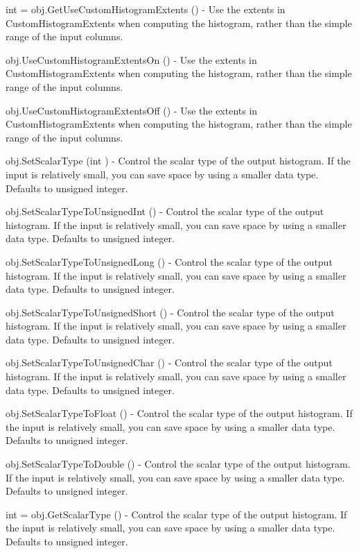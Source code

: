 \begin{DoxyItemize}
\item {\ttfamily int = obj.\-Get\-Use\-Custom\-Histogram\-Extents ()} -\/ Use the extents in Custom\-Histogram\-Extents when computing the histogram, rather than the simple range of the input columns.  
\item {\ttfamily obj.\-Use\-Custom\-Histogram\-Extents\-On ()} -\/ Use the extents in Custom\-Histogram\-Extents when computing the histogram, rather than the simple range of the input columns.  
\item {\ttfamily obj.\-Use\-Custom\-Histogram\-Extents\-Off ()} -\/ Use the extents in Custom\-Histogram\-Extents when computing the histogram, rather than the simple range of the input columns.  
\item {\ttfamily obj.\-Set\-Scalar\-Type (int )} -\/ Control the scalar type of the output histogram. If the input is relatively small, you can save space by using a smaller data type. Defaults to unsigned integer.  
\item {\ttfamily obj.\-Set\-Scalar\-Type\-To\-Unsigned\-Int ()} -\/ Control the scalar type of the output histogram. If the input is relatively small, you can save space by using a smaller data type. Defaults to unsigned integer.  
\item {\ttfamily obj.\-Set\-Scalar\-Type\-To\-Unsigned\-Long ()} -\/ Control the scalar type of the output histogram. If the input is relatively small, you can save space by using a smaller data type. Defaults to unsigned integer.  
\item {\ttfamily obj.\-Set\-Scalar\-Type\-To\-Unsigned\-Short ()} -\/ Control the scalar type of the output histogram. If the input is relatively small, you can save space by using a smaller data type. Defaults to unsigned integer.  
\item {\ttfamily obj.\-Set\-Scalar\-Type\-To\-Unsigned\-Char ()} -\/ Control the scalar type of the output histogram. If the input is relatively small, you can save space by using a smaller data type. Defaults to unsigned integer.  
\item {\ttfamily obj.\-Set\-Scalar\-Type\-To\-Float ()} -\/ Control the scalar type of the output histogram. If the input is relatively small, you can save space by using a smaller data type. Defaults to unsigned integer.  
\item {\ttfamily obj.\-Set\-Scalar\-Type\-To\-Double ()} -\/ Control the scalar type of the output histogram. If the input is relatively small, you can save space by using a smaller data type. Defaults to unsigned integer.  
\item {\ttfamily int = obj.\-Get\-Scalar\-Type ()} -\/ Control the scalar type of the output histogram. If the input is relatively small, you can save space by using a smaller data type. Defaults to unsigned integer.  

\end{DoxyItemize}
